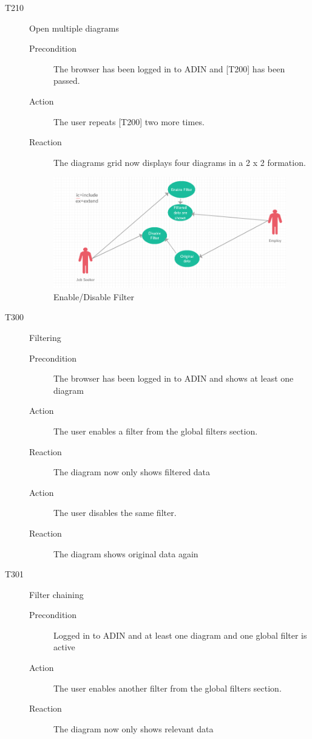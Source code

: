 \documentclass[twoside, english, draft]{Pflichtenheft}
\begin{document}
\begin{description}
  \item[T210] Open multiple diagrams
\begin{description}
    \item[Precondition]
    The browser has been logged in to ADIN and [T200] has been passed.
    \item[Action]
    The user repeats [T200] two more times.
    \item[Reaction]
    The diagrams grid now displays four diagrams in a 2 x 2 formation.

\end{description}
 \begin{figure}
\centering
\includegraphics[width=\textwidth]{Images/filter.png}
\caption{Enable/Disable Filter}
\end{figure}
 

  \item[T300] Filtering
\begin{description}
    \item[Precondition]
	The browser has been logged in to ADIN and shows at least one diagram
    \item[Action]
    The user enables a filter from the global filters section.
    \item[Reaction]
	The diagram now only shows filtered data
	\item[Action]
    The user disables the same filter.
    \item[Reaction]
	The diagram shows original data again
\end{description}

  \item[T301] Filter chaining
\begin{description}
    \item[Precondition]
	Logged in to ADIN and at least one diagram and one global filter is active
    \item[Action]
    The user enables another filter from the global filters section.
    \item[Reaction]
	The diagram now only shows relevant data
\end{description}


\end{description}
\end{document}
